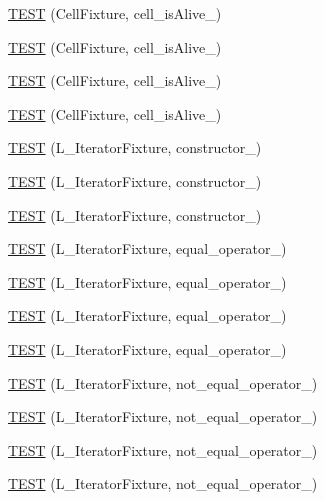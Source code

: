 \begin{DoxyCompactItemize}
\hyperlink{TestLife_8c_09_09_adbc36c1e61b8bd661ec4ca18b262b0d6}{T\-E\-S\-T} (Cell\-Fixture, cell\-\_\-is\-Alive\-\_)
\item 
\hyperlink{TestLife_8c_09_09_aba36a37810b4c8ac7a33fe312f037d15}{T\-E\-S\-T} (Cell\-Fixture, cell\-\_\-is\-Alive\-\_)
\item 
\hyperlink{TestLife_8c_09_09_a6819aa700e86d15276187df0133c998a}{T\-E\-S\-T} (Cell\-Fixture, cell\-\_\-is\-Alive\-\_)
\item 
\hyperlink{TestLife_8c_09_09_a2b8000936f49749f0c61e89368116f2c}{T\-E\-S\-T} (Cell\-Fixture, cell\-\_\-is\-Alive\-\_)
\item 
\hyperlink{TestLife_8c_09_09_af295f80b7338e9a9de75522836d51107}{T\-E\-S\-T} (L\-\_\-\-Iterator\-Fixture, constructor\-\_)
\item 
\hyperlink{TestLife_8c_09_09_a29de2eb115746d625d5c86eae3446240}{T\-E\-S\-T} (L\-\_\-\-Iterator\-Fixture, constructor\-\_)
\item 
\hyperlink{TestLife_8c_09_09_a6edd6007d7159bed47a9945e8466a95e}{T\-E\-S\-T} (L\-\_\-\-Iterator\-Fixture, constructor\-\_)
\item 
\hyperlink{TestLife_8c_09_09_af4b17935b8fc460e7c68913a35c4ad90}{T\-E\-S\-T} (L\-\_\-\-Iterator\-Fixture, equal\-\_\-operator\-\_)
\item 
\hyperlink{TestLife_8c_09_09_a9bd5716aba80dfd42d256c4622fd530d}{T\-E\-S\-T} (L\-\_\-\-Iterator\-Fixture, equal\-\_\-operator\-\_)
\item 
\hyperlink{TestLife_8c_09_09_a63a587dba7236109c9ccb9a14abfca1e}{T\-E\-S\-T} (L\-\_\-\-Iterator\-Fixture, equal\-\_\-operator\-\_)
\item 
\hyperlink{TestLife_8c_09_09_ab2bacafc450e2d7082a3b9a48975d14c}{T\-E\-S\-T} (L\-\_\-\-Iterator\-Fixture, equal\-\_\-operator\-\_)
\item 
\hyperlink{TestLife_8c_09_09_a451644a8e3a6ef78f90ee0880eea166d}{T\-E\-S\-T} (L\-\_\-\-Iterator\-Fixture, not\-\_\-equal\-\_\-operator\-\_)
\item 
\hyperlink{TestLife_8c_09_09_a13c634061e2547b7ec3c512b9e2b3039}{T\-E\-S\-T} (L\-\_\-\-Iterator\-Fixture, not\-\_\-equal\-\_\-operator\-\_)
\item 
\hyperlink{TestLife_8c_09_09_a1262f7ba18e9cb1609f27a7ea2730308}{T\-E\-S\-T} (L\-\_\-\-Iterator\-Fixture, not\-\_\-equal\-\_\-operator\-\_)
\item 
\hyperlink{TestLife_8c_09_09_a70150f8d6042a2f7d3f94f823ff814c3}{T\-E\-S\-T} (L\-\_\-\-Iterator\-Fixture, not\-\_\-equal\-\_\-operator\-\_)

\end{DoxyCompactItemize}
